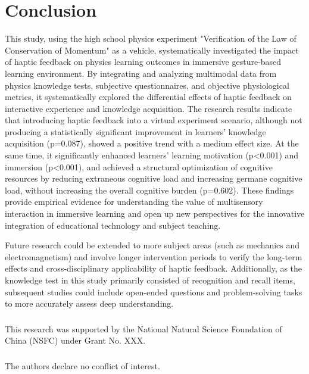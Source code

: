 \documentclass[runningheads]{llncs}
\begin{document}
\section{Conclusion}
This study, using the high school physics experiment "Verification of the Law of Conservation of Momentum" as a vehicle, systematically investigated the impact of haptic feedback on physics learning outcomes in immersive gesture-based learning environment. By integrating and analyzing multimodal data from physics knowledge tests, subjective questionnaires, and objective physiological metrics, it systematically explored the differential effects of haptic feedback on interactive experience and knowledge acquisition. The research results indicate that introducing haptic feedback into a virtual experiment scenario, although not producing a statistically significant improvement in learners' knowledge acquisition (p=0.087), showed a positive trend with a medium effect size. At the same time, it significantly enhanced learners' learning motivation (p<0.001) and immersion (p<0.001), and achieved a structural optimization of cognitive resources by reducing extraneous cognitive load and increasing germane cognitive load, without increasing the overall cognitive burden (p=0.602). These findings provide empirical evidence for understanding the value of multisensory interaction in immersive learning and open up new perspectives for the innovative integration of educational technology and subject teaching.

Future research could be extended to more subject areas (such as mechanics and electromagnetism) and involve longer intervention periods to verify the long-term effects and cross-disciplinary applicability of haptic feedback. Additionally, as the knowledge test in this study primarily consisted of recognition and recall items, subsequent studies could include open-ended questions and problem-solving tasks to more accurately assess deep understanding.

\begin{credits}
\subsubsection{\ackname} 
This research was supported by the National Natural Science Foundation of China (NSFC) under Grant No. XXX.

\subsubsection{\discintname}
The authors declare no conflict of interest.
\end{credits}


\end{document}
